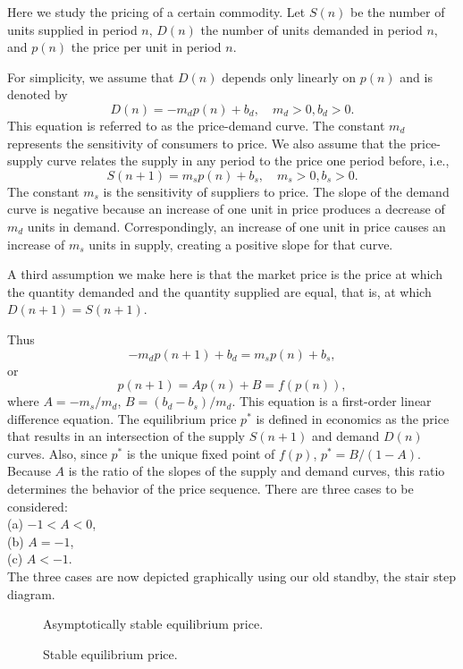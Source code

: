 \begin{eg}
Here we study the pricing of a certain commodity. Let $S(n)$ be the number of units supplied in period $n$, $D(n)$ the number of units demanded in period $n$, and $p(n)$ the price per unit in period $n$.

For simplicity, we assume that $D(n)$ depends only linearly on $p(n)$ and is denoted by
\[
    D(n)=-m_d p(n)+b_d,\quad m_d>0, b_d>0.
\]
This equation is referred to as the price-demand curve. The constant $m_d$ represents the sensitivity of consumers to price. We also assume that the price-supply curve relates the supply in any period to the price one period before, i.e.,
\[
    S(n+1)=m_s p(n)+b_s,\quad m_s>0, b_s>0.
\]
The constant $m_s$ is the sensitivity of suppliers to price. The slope of the demand curve is negative because an increase of one unit in price produces a decrease of $m_d$ units in demand. Correspondingly, an increase of one unit in price causes an increase of $m_s$ units in supply, creating a positive slope for that curve.

A third assumption we make here is that the market price is the price at which the quantity demanded and the quantity supplied are equal, that is, at which $D(n+1)=S(n+1)$.

Thus
\[
    -m_d p(n+1)+b_d=m_s p(n)+b_s,
\]
or
\[
    p(n+1)=Ap(n)+B=f(p(n)),
\]
where $A=-m_s/m_d$, $B=(b_d-b_s)/m_d$. This equation is a first-order linear difference equation. The equilibrium price $p^*$ is defined in economics as the price that results in an intersection of the supply $S(n+1)$ and demand $D(n)$ curves. Also, since $p^*$ is the unique fixed point of $f(p)$, $p^*=B/(1-A)$. Because $A$ is the ratio of the slopes of the supply and demand curves, this ratio determines the behavior of the price sequence. There are three cases to be considered: \\
(a) $-1<A<0$, \\
(b) $A=-1$, \\
(c) $A<-1$. \\
The three cases are now depicted graphically using our old standby, the stair step diagram.
\begin{figure}[H]
    \centering
    \caption{Asymptotically stable equilibrium price.}
\end{figure}
\begin{figure}[H]
    \centering
    \caption{Stable equilibrium price.}
\end{figure}
\end{eg}
